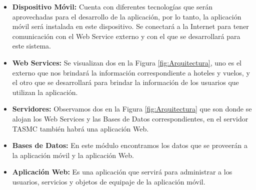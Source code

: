 \begin{itemize}
	\item \textbf{Dispositivo Móvil: }Cuenta con diferentes tecnologías que serán aprovechadas para el desarrollo de la aplicación, por lo tanto, la aplicación móvil será instalada en este dispositivo. Se conectará a la Internet para tener comunicación con el Web Service externo y con el que se desarrollará para este sistema.
	\item \textbf{Web Services: }Se visualizan dos en la Figura \ref{fig:Arquitectura}, uno es el externo que nos brindará la información correspondiente a hoteles y vuelos, y el otro que se desarrollará para brindar la información de los usuarios que utilizan la aplicación. 
	\item \textbf{Servidores: }Observamos dos en la Figura \ref{fig:Arquitectura} que son donde se alojan los Web Services y las Bases de Datos correspondientes, en el servidor TASMC también habrá una aplicación Web.
	\item \textbf{Bases de Datos: }En este módulo encontramos los datos que se proveerán a la aplicación móvil y la aplicación Web.
	\item \textbf{Aplicación Web: }Es una aplicación que servirá para administrar a los usuarios, servicios y objetos de equipaje de la aplicación móvil.
\end{itemize}